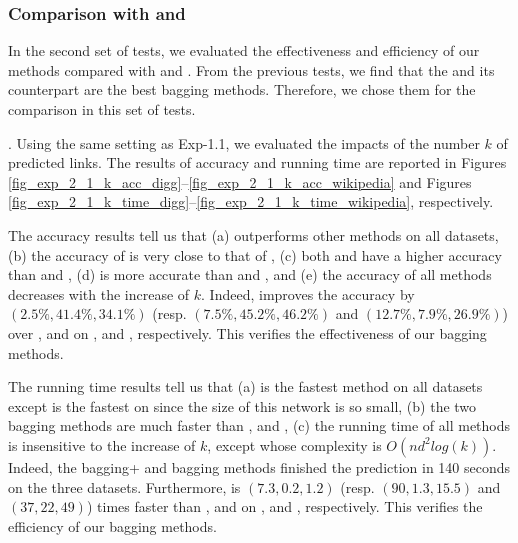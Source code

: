 \subsubsection{Comparison with \Aa and \BIGCLAM}
In the second set of tests, we evaluated the effectiveness and efficiency of our
methods compared with \Aa and \BIGCLAM. From the previous tests, we find that the
\Biasedp and its counterpart \Biased are the best bagging methods. Therefore, we
chose them for the comparison in this set of tests.


. Using the same setting as Exp-1.1, we evaluated
the impacts of the number $k$ of predicted links.
The results of accuracy and running time are reported in Figures \ref{fig_exp_2_1_k_acc_digg}--\ref{fig_exp_2_1_k_acc_wikipedia}
and Figures \ref{fig_exp_2_1_k_time_digg}--\ref{fig_exp_2_1_k_time_wikipedia}, respectively.


The accuracy results tell us that (a) \Biased outperforms other methods on all datasets,
(b) the accuracy of \Biasedp is very close to that of \Biased, (c) both
\Biased and \Biasedp have a higher accuracy than \Aa and \BIGCLAM, (d) \NMF is more accurate
than \Aa and \BIGCLAM, and (e) the accuracy of all methods decreases with the increase of $k$.
Indeed, \Biased improves the accuracy by $(2.5\%, 41.4\%, 34.1\%)$ (resp. $(7.5\%, 45.2\%, 46.2\%)$
and $(12.7\%, 7.9\%, 26.9\%)$) over \NMF, \Aa and \BIGCLAM on \Digg, \YouTube and \Wikipedia,
respectively. This verifies the effectiveness of our bagging methods.


The running time results tell us that (a) \Biasedp is the fastest method on all
datasets except \Aa is the fastest on \Digg since the size of this network is so
small, (b) the two bagging methods are much faster than \NMF, \Aa and \BIGCLAM,
(c) the running time of all methods is insensitive to the increase of $k$,
except \Aa whose complexity is $O(nd^2log(k))$.
Indeed, the bagging+ and bagging methods finished the prediction in 140 seconds on the three datasets.
Furthermore, \Biasedp is $(7.3, 0.2, 1.2)$ (resp. $(90, 1.3, 15.5)$ and $(37, 22, 49)$)
times faster than \NMF, \Aa and \BIGCLAM on
\Digg, \YouTube and \Wikipedia, respectively.
This verifies the efficiency of our bagging methods.


